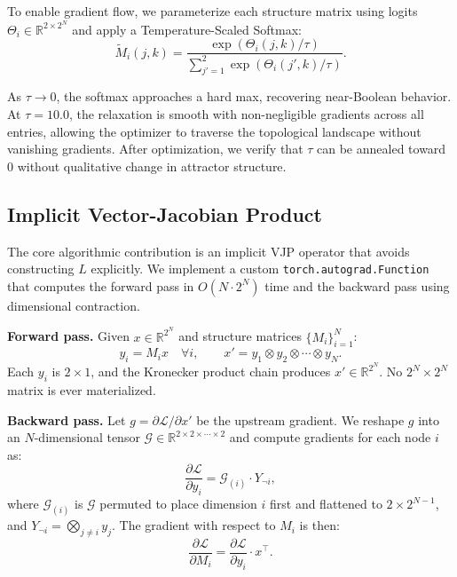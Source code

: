 \documentclass[11pt,a4paper]{article}
\begin{document}
To enable gradient flow, we parameterize each structure matrix using logits $\Theta_i \in \mathbb{R}^{2 \times 2^N}$ and apply a Temperature-Scaled Softmax:
\begin{equation}\label{eq:softmax}
\tilde{M}_i(j,k) = \frac{\exp(\Theta_i(j,k) / \tau)}{\sum_{j'=1}^2 \exp(\Theta_i(j',k) / \tau)}.
\end{equation}

As $\tau \to 0$, the softmax approaches a hard max, recovering near-Boolean behavior. At $\tau = 10.0$, the relaxation is smooth with non-negligible gradients across all entries, allowing the optimizer to traverse the topological landscape without vanishing gradients. After optimization, we verify that $\tau$ can be annealed toward $0$ without qualitative change in attractor structure.

\subsection{Implicit Vector-Jacobian Product}
\label{sec:vjp}

The core algorithmic contribution is an implicit VJP operator that avoids constructing $L$ explicitly. We implement a custom \texttt{torch.autograd.Function} that computes the forward pass in $O(N \cdot 2^N)$ time and the backward pass using dimensional contraction.

\noindent\textbf{Forward pass.} Given $x \in \mathbb{R}^{2^N}$ and structure matrices $\{M_i\}_{i=1}^N$:
\begin{equation}
y_i = M_i x \quad \forall i, \qquad
x' = y_1 \otimes y_2 \otimes \cdots \otimes y_N.
\end{equation}
Each $y_i$ is $2 \times 1$, and the Kronecker product chain produces $x' \in \mathbb{R}^{2^N}$. No $2^N \times 2^N$ matrix is ever materialized.

\noindent\textbf{Backward pass.} Let $g = \partial \mathcal{L} / \partial x'$ be the upstream gradient. We reshape $g$ into an $N$-dimensional tensor $\mathcal{G} \in \mathbb{R}^{2 \times 2 \times \cdots \times 2}$ and compute gradients for each node $i$ as:
\begin{equation}
\frac{\partial \mathcal{L}}{\partial y_i} = \mathcal{G}_{(i)} \cdot Y_{\neg i},
\end{equation}
where $\mathcal{G}_{(i)}$ is $\mathcal{G}$ permuted to place dimension $i$ first and flattened to $2 \times 2^{N-1}$, and $Y_{\neg i} = \bigotimes_{j \neq i} y_j$. The gradient with respect to $M_i$ is then:
\begin{equation}
\frac{\partial \mathcal{L}}{\partial M_i} = \frac{\partial \mathcal{L}}{\partial y_i} \cdot x^\top.
\end{equation}
\end{document}
